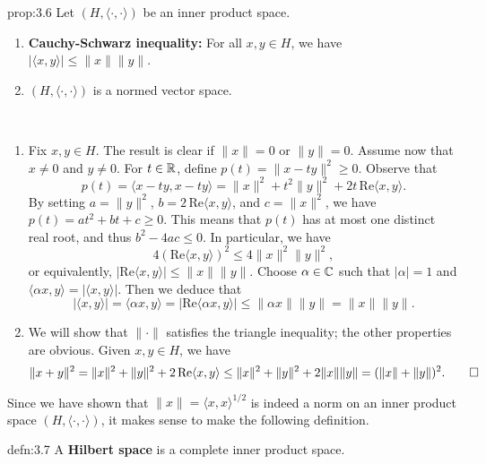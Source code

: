 \begin{prop}{prop:3.6}
    Let $(H, \langle \cdot, \cdot \rangle)$ be an inner product space. 
    \begin{enumerate}[(1)]
        \item {\bf Cauchy-Schwarz inequality:} For all $x, y \in H$, 
        we have $|\langle x, y \rangle| \leq \|x\|\|y\|$. 
        \item $(H, \langle \cdot, \cdot \rangle)$ is a normed vector space. 
    \end{enumerate}
\end{prop}
\begin{pf}~
    \begin{enumerate}[(1)]

        \item Fix $x, y \in H$. The result is clear if $\|x\| = 0$ or 
        $\|y\| = 0$. Assume now that $x \neq 0$ and $y \neq 0$. For 
        $t \in \mathbb{R}$, define $p(t) = \|x - ty\|^2 \geq 0$. Observe that 
        \[ p(t) = \langle x - ty, x - ty \rangle = \|x\|^2 
        + t^2 \|y\|^2 + 2t\,\text{Re}\langle x, y \rangle. \] 
        By setting $a = \|y\|^2$, $b = 2\,\text{Re}\langle x, y \rangle$, 
        and $c = \|x\|^2$, we have $p(t) = at^2 + bt + c \geq 0$. 
        This means that $p(t)$ has at most one distinct real root, 
        and thus $b^2 - 4ac \leq 0$. In particular, we have 
        \[ 4(\text{Re}\langle x, y \rangle)^2 \leq 4\|x\|^2\|y\|^2, \] 
        or equivalently, $|\text{Re}\langle x, y \rangle| \leq \|x\|\|y\|$. 
        Choose $\alpha \in \mathbb{C}$ such that $|\alpha| = 1$ and 
        $\langle \alpha x, y \rangle = |\langle x, y \rangle|$. Then 
        we deduce that 
        \[ |\langle x, y \rangle| = \langle \alpha x, y \rangle
        = |\text{Re}\langle \alpha x, y \rangle| \leq \|\alpha x\|\|y\| 
        = \|x\|\|y\|. \] 

        \item We will show that $\|\cdot\|$ satisfies the triangle 
        inequality; the other properties are obvious. Given $x, y \in H$, 
        we have 
        \[ \|x + y\|^2 = \|x\|^2 + \|y\|^2 + 2\,\text{Re}\langle x, y \rangle 
        \leq \|x\|^2 + \|y\|^2 + 2\|x\|\|y\| = (\|x\| + \|y\|)^2. \qedhere \] 
    \end{enumerate}
\end{pf}

Since we have shown that $\|x\| = \langle x, x \rangle^{1/2}$ is indeed a 
norm on an inner product space $(H, \langle \cdot, \cdot \rangle)$, it 
makes sense to make the following definition. 

\begin{defn}{defn:3.7}
    A {\bf Hilbert space} is a complete inner product space. 
\end{defn}
